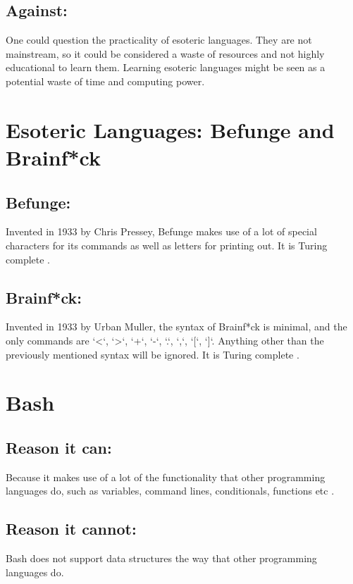 \documentclass{article}
\begin{document}
\subsection*{Against:}
One could question the practicality of esoteric languages. They are not mainstream, so it could be considered a waste of resources and not highly educational to learn them. Learning esoteric languages might be seen as a potential waste of time and computing power.


\section{Esoteric Languages: Befunge and Brainf*ck}
\label{sec:esolanguages}

\subsection*{Befunge:}
Invented in 1933 by Chris Pressey, Befunge makes use of a lot of special characters for its commands as well as letters for printing out. It is Turing complete \cite{befunge}.

\subsection*{Brainf*ck:}
Invented in 1933 by Urban Muller, the syntax of Brainf*ck is minimal, and the only commands are `<`, `>`, `+`, `-`, `.`, `,`, `[`, `]`. Anything other than the previously mentioned syntax will be ignored. It is Turing complete \cite{brainfuck}.


\section{Bash}
\label{sec:Bash}

\subsection*{Reason it can:}
Because it makes use of a lot of the functionality that other programming languages do, such as variables, command lines, conditionals, functions etc \cite{linuxsimply-bash}.

\subsection*{Reason it cannot:}
Bash does not support data structures the way that other programming languages do.
\end{document}
